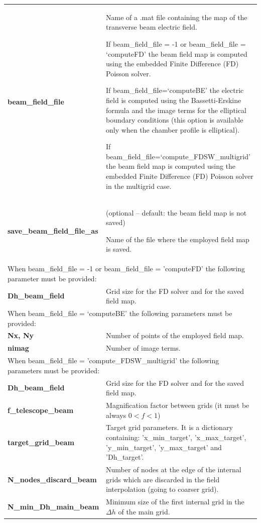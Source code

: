 \documentclass[a4paper,12pt]{article}
\begin{document}
\begin{longtable}{p{}p{}}
\hline\endfirsthead\hline\endhead\rowcolor{Gray}
\multicolumn{2}{p{.97\textwidth}}{
\textbf{Transverse electric field of the beam}}\\ \hline
\textbf{beam\_field\_file}&	Name of a .mat file containing the map of the transverse beam electric field.

If beam\_field\_file = -1 or beam\_field\_file = `computeFD' the beam field map is computed using the embedded Finite Difference (FD) Poisson solver.

If beam\_field\_file=`computeBE' the electric field is computed using the Bassetti-Erskine formula and the image terms for the elliptical boundary conditions (this option is available only when the chamber profile is elliptical).

If beam\_field\_file=`compute\_FDSW\_multigrid' the beam field map is computed using the embedded Finite Difference (FD) Poisson solver in the multigrid case. \\ \hline
\textbf{save\_beam\_field\_file\_as}&	(optional -- default: the beam field map is not saved)

Name of the file where the employed field map is saved.\\  \hline
\multicolumn{2}{p{.97\textwidth}}{
When beam\_field\_file = -1 or beam\_field\_file = 'computeFD' the following parameter must be provided:}\\ \hline
\textbf{Dh\_beam\_field}&	Grid size for the FD solver and for the saved field map.\\ \hline
\multicolumn{2}{p{.97\textwidth}}{
When beam\_field\_file = `computeBE' the following parameters must be provided:}\\ \hline
\textbf{Nx, Ny} & Number of points of the employed field map. \\ \hline
\textbf{nimag} & 	Number of image terms.\\ \hline\multicolumn{2}{p{.97\textwidth}}{
	When beam\_field\_file = 'compute\_FDSW\_multigrid' the following parameters must be provided:}\\ \hline
\textbf{Dh\_beam\_field}&	Grid size for the FD solver and for the saved field map.\\ \hline
\textbf{f\_telescope\_beam}& Magnification factor between grids (it must be always $0<f<1$)	\\ \hline
\textbf{target\_grid\_beam }& Target grid parameters. It is a dictionary containing: 'x\_min\_target', 'x\_max\_target', 'y\_min\_target', 'y\_max\_target' and 'Dh\_target'.	\\ \hline
\textbf{N\_nodes\_discard\_beam}& Number of nodes at the edge of the internal grids which are discarded in the field interpolation (going to coarser grid).	\\ \hline
\textbf{N\_min\_Dh\_main\_beam}& Minimum size of the first internal grid in the $\Delta h$ of the main grid.	\\ \hline
\hline
\end{longtable}
\end{document}
